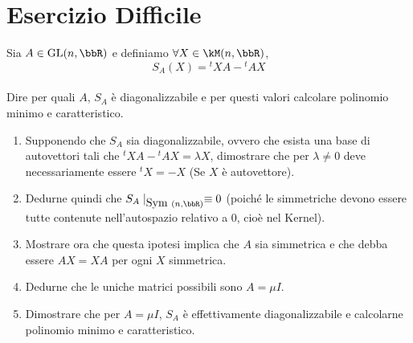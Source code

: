 \documentclass[a4paper,NoNotes,GeneralMath]{stdmdoc}
\begin{document}
	\section*{Esercizio Difficile}
	Sia $A \in \GL(n, \bbR)$ e definiamo $\forall X \in \kM(n,\bbR)$, $$ S_A(X) = {}^tXA - {}^tAX $$ \\
	Dire per quali $A$, $S_A$ è diagonalizzabile e per questi valori calcolare polinomio minimo e caratteristico.
	\begin{enumerate}
		\item Supponendo che $S_A$ sia diagonalizzabile, ovvero che esista una base di autovettori tali che ${}^tXA - {}^tAX = \lambda X$, dimostrare che per $\lambda \neq 0$ deve necessariamente essere ${}^tX = -X$ (Se $X$ è autovettore).
		\item Dedurne quindi che $S_A\mid_{\Symm(n,\bbR)} \equiv 0$ (poiché le simmetriche devono essere tutte contenute nell'autospazio relativo a $0$, cioè nel Kernel).
		\item Mostrare ora che questa ipotesi implica che $A$ sia simmetrica e che debba essere $AX = XA$ per ogni $X$ simmetrica.
		\item Dedurne che le uniche matrici possibili sono $A = \mu I$.
		\item Dimostrare che per $A = \mu I$, $S_A$ è effettivamente diagonalizzabile e calcolarne polinomio minimo e caratteristico.
	\end{enumerate}
\end{document}
